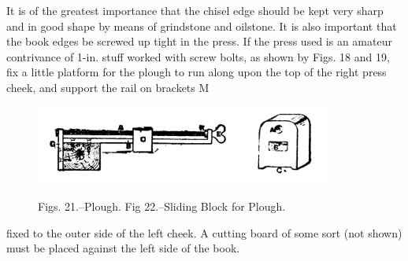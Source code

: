 \documentclass[twoside]{book}
\begin{document}
It is of the greatest importance that the chisel
edge should be kept very sharp and in good shape
by means of grindstone and oilstone. It is also
important that the book edges be screwed up tight
in the press. If the press used is an amateur
contrivance of 1-in. stuff worked with screw bolts, as
shown by Figs. 18 and 19, fix a little platform for
the plough to run along upon the top of the right
press cheek, and support the rail on brackets M
	\begin{figure}[h]
		\centering
		\includegraphics[width=0.6\textwidth]{Figures/_021.png}
		\includegraphics[width=0.25\textwidth]{Figures/_022.png}
		\caption*{Figs. 21.--Plough.  Fig 22.--Sliding Block for Plough.}
	\end{figure}
fixed to the outer side of the left cheek. A cutting
board of some sort (not shown) must be placed
against the left side of the book.
\end{document}
